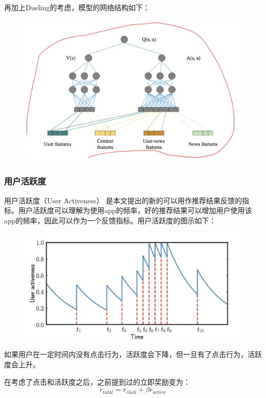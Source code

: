 \documentclass[12pt]{article}
\begin{document}
再加上Dueling的考虑，模型的网络结构如下：
\begin{figure}[H]
    \centering
    \includegraphics[width=1\textwidth]{fig/DRN_Q_Value_Whole.png}
\end{figure}

\subsubsection{用户活跃度}
用户活跃度（User Activeness） 是本文提出的新的可以用作推荐结果反馈的指标。用户活跃度可以理解为使用app的频率，好的推荐结果可以增加用户使用该app的频率，因此可以作为一个反馈指标。用户活跃度的图示如下：
\begin{figure}[H]
    \centering
    \includegraphics[width=1\textwidth]{fig/DRN_User_Life.png}
\end{figure}


如果用户在一定时间内没有点击行为，活跃度会下降，但一旦有了点击行为，活跃度会上升。

在考虑了点击和活跃度之后，之前提到过的立即奖励变为：
$$
r_{total} = r_{click} + \beta r_{active}
$$
\end{document}
